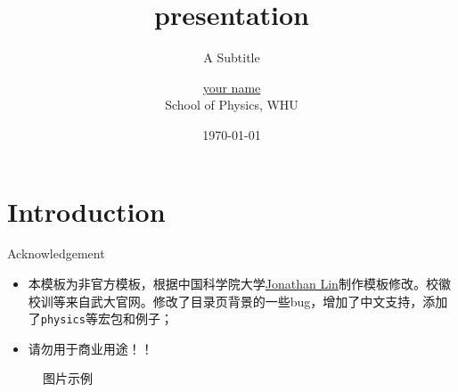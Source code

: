 \documentclass[10pt,aspectratio=169]{beamer}
\title{presentation}
\subtitle{A Subtitle}
\author{\href{link}{your name}
\\ 
School of Physics, WHU
}
\date{\today}
\begin{document}
\maketitle

\section{Introduction}

\begin{frame}{Acknowledgement}
    \begin{itemize}
        \item 本模板为非官方模板，根据中国科学院大学\href{https://cn.overleaf.com/project/67d429aed396086bd4f730ff}{Jonathan Lin}\cite{url}制作模板修改。校徽校训等来自武大官网。修改了目录页背景的一些bug，增加了中文支持，添加了\texttt{physics}等宏包和例子；
        \item \textcolor{whugreen}{ 请勿用于商业用途！！}
    \end{itemize}
    \begin{figure}[h]
        \centering
        \hfill
        \hfill
        \hfill
        \newline
        \caption{图片示例}
    \end{figure}
\end{frame}
\end{document}
